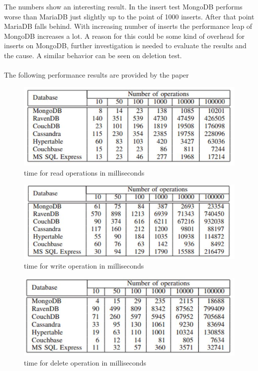The numbers show an interesting result. In the insert test MongoDB performs worse than MariaDB just slightly up to the point of 1000 inserts. After that point MariaDB falls behind. With increasing number of inserts the performance leap of MongoDB increases a lot. A reason for this could be some kind of overhead for inserts on MongoDB, further investigation is needed to evaluate the results and the cause. A similar behavior can be seen on deletion test.
\\\\
The following performance results are provided by the paper \cite{Li_A_2013}
\begin{figure}[H]
\includegraphics[width=\linewidth,keepaspectratio]{images/Performance_Reads.JPG}
\caption{time for read operations in milliseconds}
\label{arch-example2}
\end{figure}
\begin{figure}[H]
\includegraphics[width=\linewidth,keepaspectratio]{images/Performance_Writes.JPG}
\caption{time for write operation in milliseconds}
\label{arch-example3}
\end{figure}
\begin{figure}[H]
\includegraphics[width=\linewidth,keepaspectratio]{images/Performance_Delete.JPG}
\caption{time for delete operation in milliseconds}
\label{arch-exampl1}
\end{figure}

